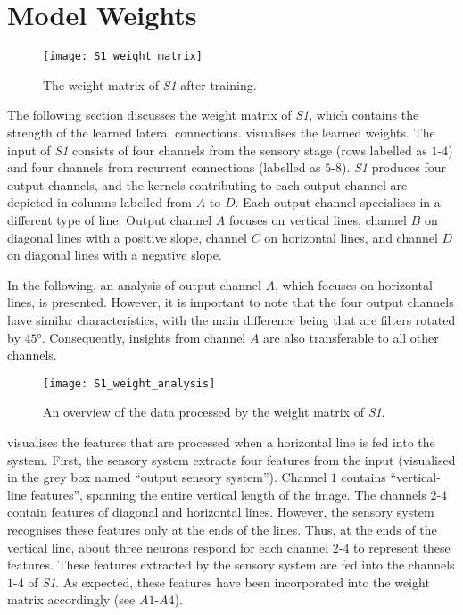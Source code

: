 \section{Model Weights}
%
\begin{figure}[h]
    \centering
    \texttt{[image: S1\_weight\_matrix]}
    \caption[Weight matrix of \emph{S1} after training]{The weight matrix of \emph{S1} after training.}
\end{figure}
%
The following section discusses the weight matrix of \emph{S1}, which contains the strength of the learned lateral connections.
 visualises the learned weights. 
The input of \emph{S1} consists of four channels from the sensory stage (rows labelled as $1$-$4$) and four channels from recurrent connections (labelled as $5$-$8$).
\emph{S1} produces four output channels, and the kernels contributing to each output channel are depicted in columns labelled from $A$ to $D$.
Each output channel specialises in a different type of line: Output channel $A$ focuses on vertical lines, channel $B$ on diagonal lines with a positive slope, channel $C$ on horizontal lines, and channel $D$ on diagonal lines with a negative slope.

In the following, an analysis of output channel $A$, which focuses on horizontal lines, is presented.
However, it is important to note that the four output channels have similar characteristics, with the main difference being that are filters rotated by $45°$. Consequently, insights from channel $A$ are also transferable to all other channels.

\begin{figure}[h]
    \centering
    \texttt{[image: S1\_weight\_analysis]}
    \caption[Analysis of weight matrix]{An overview of the data processed by the weight matrix of \emph{S1}.}
\end{figure}
%
 visualises the features that are processed when a horizontal line is fed into the system.
First, the sensory system extracts four features from the input (visualised in the grey box named ``output sensory system'').
Channel $1$ contains ``vertical-line features'', spanning the entire vertical length of the image. 
The channels $2$-$4$ contain features of diagonal and horizontal lines. However, the sensory system recognises these features only at the ends of the lines.
Thus, at the ends of the vertical line, about three neurons respond for each channel $2$-$4$ to represent these features.
These features extracted by the sensory system are fed into the channels $1$-$4$ of \emph{S1}.
As expected, these features have been incorporated into the weight matrix accordingly (see $A1$-$A4$).

